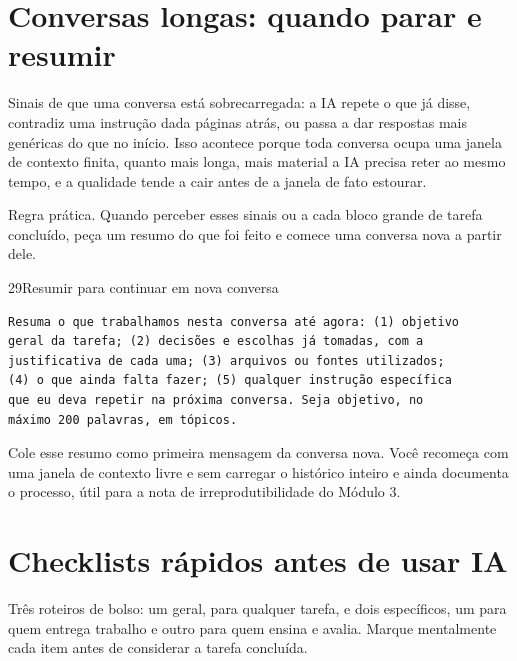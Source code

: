 \documentclass[11pt,a4paper]{article}
\begin{document}

\section{Conversas longas: quando parar e resumir}
\small
Sinais de que uma conversa está sobrecarregada: a IA repete o que já disse, contradiz uma instrução dada páginas atrás, ou passa a dar respostas mais genéricas do que no início. Isso acontece porque toda conversa ocupa uma janela de contexto finita, quanto mais longa, mais material a IA precisa reter ao mesmo tempo, e a qualidade tende a cair antes de a janela de fato estourar.
\begin{dica}
Regra prática. Quando perceber esses sinais ou a cada bloco grande de tarefa concluído, peça um resumo do que foi feito e comece uma conversa nova a partir dele.
\end{dica}

\begin{modelo}{29}{Resumir para continuar em nova conversa}
\begin{lstlisting}
Resuma o que trabalhamos nesta conversa até agora: (1) objetivo
geral da tarefa; (2) decisões e escolhas já tomadas, com a
justificativa de cada uma; (3) arquivos ou fontes utilizados;
(4) o que ainda falta fazer; (5) qualquer instrução específica
que eu deva repetir na próxima conversa. Seja objetivo, no
máximo 200 palavras, em tópicos.
\end{lstlisting}
\end{modelo}
\vspace{2pt}
Cole esse resumo como primeira mensagem da conversa nova. Você recomeça com uma janela de contexto livre e sem carregar o histórico inteiro e ainda documenta o processo, útil para a nota de irreprodutibilidade do Módulo 3.

\section{Checklists rápidos antes de usar IA}
\small
Três roteiros de bolso: um geral, para qualquer tarefa, e dois específicos, um para quem entrega trabalho e outro para quem ensina e avalia. Marque mentalmente cada item antes de considerar a tarefa concluída.
\end{document}
